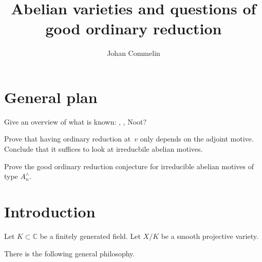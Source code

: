 \documentclass{article}
\title{Abelian varieties and questions of good ordinary reduction}
\author{Johan Commelin}
\begin{document}
\maketitle

\section{General plan}

Give an overview of what is known:
\cite{MR1603865},
\cite{MR3494322},
Noot?

Prove that having ordinary reduction at~$v$ only depends on the adjoint motive.
Conclude that it suffices to look at irreducbile abelian motives.

Prove the good ordinary reduction conjecture
for irreducible abelian motives of type $A_n^\wedge$.

\section{Introduction}

Let $K \subset \mathbb{C}$ be a finitely generated field.
Let $X/K$ be a smooth projective variety.


There is the following general philosophy.

\printbibliography
\end{document}
